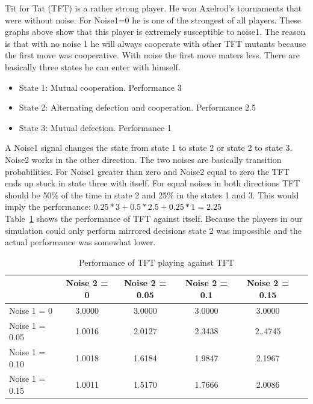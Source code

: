 Tit for Tat (TFT) is a rather strong player. He won Axelrod's tournaments that were without noise. For Noise1=0 he is one of the strongest of all players. These graphs above show that this player is extremely susceptible to noise1. The reason is that with no noise 1 he will always cooperate with other TFT mutants because the first move was cooperative. With noise the first move maters less. There are basically three states he can enter with himself.\\

\renewcommand{\labelitemi}{}

\begin{itemize}
	\item State 1: Mutual cooperation. Performance 3
	\item State 2: Alternating defection and cooperation. Performance 2.5
	\item State 3: Mutual defection. Performance 1
\end{itemize}

 A Noise1 signal changes the state from state 1 to state 2 or state 2 to state 3. Noise2 works in the other direction. The two noises are basically transition probabilities. For Noise1 greater than zero and Noise2 equal to zero the TFT ends up stuck in state three with itself. For equal noises in both directions TFT should be 50\% of the time in state 2 and 25\% in the states 1 and 3. This would imply the performance: 
$0.25*3+0.5*2.5+0.25*1=2.25$\\
Table~\ref{tab:tfttable} shows the performance of TFT against itself. Because the players in our simulation could only perform mirrored decisions state 2 was impossible and the actual performance was somewhat lower.

\begin{table}[h]
 \begin{center}
\caption{Performance of TFT playing against TFT}\label{tab:tfttable} \vspace{3mm}
\begin{tabular}{|l|c|c|c|c|c|}
\hline
   	& Noise 2 = 0 & Noise 2 = 0.05& Noise 2 = 0.1& Noise 2 = 0.15 \\
  \hline
  Noise 1 = 0 	& 3.0000	 &3.0000 	&3.0000	&3.0000 \\
 \hline
  Noise 1 = 0.05	 & 1.0016	 &2.0127 	&2.3438	&2..4745 \\
 \hline
  Noise 1 = 0.10 	& 1.0018	 &1.6184 	&1.9847	&2.1967 \\
 \hline
  Noise 1 = 0.15 	& 1.0011	 &1.5170 	&1.7666	&2.0086 \\
 \hline
\end{tabular}
 \end{center}


\end{table}

